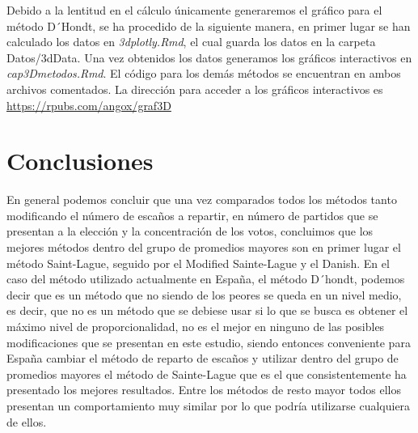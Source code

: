 \documentclass[12pt,a4paper,]{book}
\def\ifdoblecara{} %
\def\ifprincipal{} %
\numberwithin{dummy}{section}
\theoremstyle{ocrenumbox}
\theoremstyle{blacknumex}
\theoremstyle{blacknumbox}
\theoremstyle{ocrenum}
\theoremstyle{ocrenum}
\begin{document}
Debido a la lentitud en el cálculo únicamente generaremos el gráfico
para el método D´Hondt, se ha procedido de la siguiente manera, en
primer lugar se han calculado los datos en \emph{3dplotly.Rmd}, el cual
guarda los datos en la carpeta Datos/3dData. Una vez obtenidos los datos
generamos los gráficos interactivos en \emph{cap3Dmetodos.Rmd}. El
código para los demás métodos se encuentran en ambos archivos
comentados. La dirección para acceder a los gráficos interactivos es
\url{https://rpubs.com/angox/graf3D}

\hypertarget{conclusiones}{%
\section{Conclusiones}\label{conclusiones}}

En general podemos concluir que una vez comparados todos los métodos
tanto modificando el número de escaños a repartir, en número de partidos
que se presentan a la elección y la concentración de los votos,
concluimos que los mejores métodos dentro del grupo de promedios mayores
son en primer lugar el método Saint-Lague, seguido por el Modified
Sainte-Lague y el Danish. En el caso del método utilizado actualmente en
España, el método D´hondt, podemos decir que es un método que no siendo
de los peores se queda en un nivel medio, es decir, que no es un método
que se debiese usar si lo que se busca es obtener el máximo nivel de
proporcionalidad, no es el mejor en ninguno de las posibles
modificaciones que se presentan en este estudio, siendo entonces
conveniente para España cambiar el método de reparto de escaños y
utilizar dentro del grupo de promedios mayores el método de Sainte-Lague
que es el que consistentemente ha presentado los mejores resultados.
Entre los métodos de resto mayor todos ellos presentan un comportamiento
muy similar por lo que podría utilizarse cualquiera de ellos.

\FloatBarrier

\ifdefined\ifprincipal
\else
\setlength{\parindent}{1em}
\pagestyle{fancy}
\setcounter{tocdepth}{4}
\tableofcontents

\fi

\ifdefined\ifdoblecara
\fancyhead{}{}
\fancyhead[LE,RO]{\scriptsize\rightmark}
\fancyfoot[LO,RE]{\scriptsize\slshape \leftmark}
\fancyfoot[C]{}
\fancyfoot[LE,RO]{\footnotesize\thepage}
\else
\fancyhead{}{}
\fancyhead[RO]{\scriptsize\rightmark}
\fancyfoot[LO]{\scriptsize\slshape \leftmark}
\fancyfoot[C]{}
\fancyfoot[RO]{\footnotesize\thepage}
\fi
\renewcommand{\headrulewidth}{0.4pt}
\renewcommand{\footrulewidth}{0.4pt}
\end{document}

